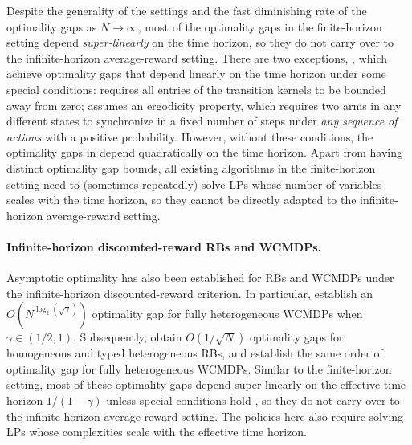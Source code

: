 \documentclass{article}
\theoremstyle{plain}
\theoremstyle{remark}
\begin{document}
Despite the generality of the settings and the fast diminishing rate of the optimality gaps as $N \to \infty$, most of the optimality gaps in the finite-horizon setting depend \emph{super-linearly} on the time horizon, so they do not carry over to the infinite-horizon average-reward setting.
There are two exceptions, \citep{BroZha_23,GasGauYan_24_reopt}, which achieve optimality gaps that depend linearly on the time horizon under some special conditions: \citep{BroZha_23} requires all entries of the transition kernels to be bounded away from zero; \citep{GasGauYan_24_reopt} assumes an ergodicity property, which requires two arms in any different states to synchronize in a fixed number of steps under \emph{any sequence of actions} with a positive probability.
However, without these conditions, the optimality gaps in \citep{BroZha_23,GasGauYan_24_reopt} depend quadratically on the time horizon.
Apart from having distinct optimality gap bounds, all existing algorithms in the finite-horizon setting need to (sometimes repeatedly) solve LPs whose number of variables scales with the time horizon, so they cannot be directly adapted to the infinite-horizon average-reward setting.

\paragraph{Infinite-horizon discounted-reward RBs and WCMDPs.}
Asymptotic optimality has also been established for RBs and WCMDPs under the infinite-horizon discounted-reward criterion.
In particular, \citet{BroSmi_19_rb} establish an $O(N^{\log_2 (\sqrt{\gamma})})$ optimality gap for fully heterogeneous WCMDPs when $\gamma \in (1/2, 1)$.
Subsequently, \citet{ZhaFra_22_discounted_rb,GhoNagJaiTam_23_finite_discount} obtain $O(1/\sqrt{N})$ optimality gaps for homogeneous and typed heterogeneous RBs, and \citet{BroZha_23} establish the same order of optimality gap for fully heterogeneous WCMDPs.
Similar to the finite-horizon setting, most of these optimality gaps depend super-linearly on the effective time horizon $1/(1-\gamma)$ unless special conditions hold \citep{BroZha_23}, so they do not carry over to the infinite-horizon average-reward setting.
The policies here also require solving LPs whose complexities scale with the effective time horizon.
\end{document}
